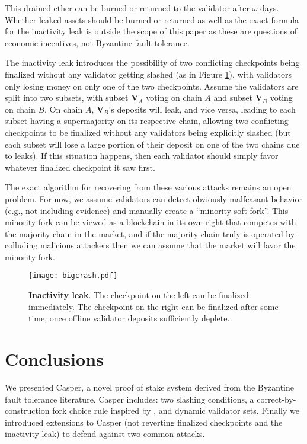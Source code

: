 \documentclass[12pt]{article}
\begin{document}
This drained ether can be burned or returned to the validator after $\omega$ days.  Whether leaked assets should be burned or returned as well as  the exact formula for the inactivity leak is outside the scope of this paper as these are questions of economic incentives, not Byzantine-fault-tolerance.

The inactivity leak introduces the possibility of two conflicting checkpoints being finalized without any validator getting slashed (as in Figure \ref{fig:bigcrash}), with validators only losing money on only one of the two checkpoints. Assume the validators are split into two subsets, with subset $\mathbf{V}_A$ voting on chain $A$ and subset $\mathbf{V}_B$ voting on chain $B$.  On chain $A$, $\mathbf{V}_B$'s deposits will leak, and vice versa, leading to each subset having a supermajority on its respective chain, allowing two conflicting checkpoints to be finalized without any validators being explicitly slashed (but each subset will lose a large portion of their deposit on one of the two chains due to leaks).  If this situation happens, then each validator should simply favor whatever finalized checkpoint it saw first.

The exact algorithm for recovering from these various attacks remains an open problem.  For now, we assume validators can detect obviously malfeasant behavior (e.g., not including evidence) and manually create a ``minority soft fork''.  This minority fork can be viewed as a blockchain in its own right that competes with the majority chain in the market, and if the majority chain truly is operated by colluding malicious attackers then we can assume that the market will favor the minority fork.

\begin{figure}[htb]
\centering
\texttt{[image: bigcrash.pdf]}
\caption{\textbf{Inactivity leak}.  The checkpoint on the left can be finalized immediately. The checkpoint on the right can be finalized after some time, once offline validator deposits sufficiently deplete.}
\label{fig:bigcrash}
\end{figure}


\section{Conclusions}
We presented Casper, a novel proof of stake system derived from the Byzantine fault tolerance literature.  Casper includes: two slashing conditions, a correct-by-construction fork choice rule inspired by \cite{sompolinsky2013accelerating}, and dynamic validator sets.  Finally we introduced extensions to Casper (not reverting finalized checkpoints and the inactivity leak) to defend against two common attacks.
\end{document}
